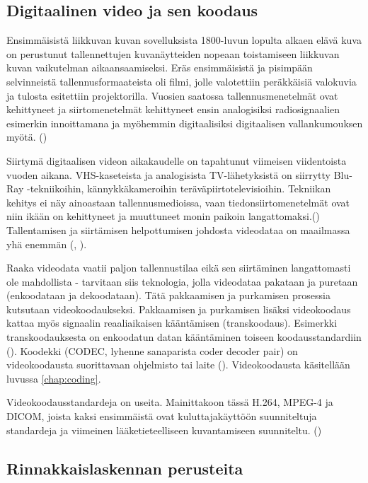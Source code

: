 \subsection{Digitaalinen video ja sen koodaus}

Ensimmäisistä liikkuvan kuvan sovelluksista 1800-luvun lopulta
alkaen elävä kuva on perustunut tallennettujen kuvanäytteiden nopeaan toistamiseen
liikkuvan kuvan vaikutelman aikaansaamiseksi.
Eräs ensimmäisistä ja pisimpään selvinneistä tallennusformaateista oli filmi,
jolle valotettiin peräkkäisiä valokuvia ja tulosta esitettiin projektorilla.
Vuosien saatossa tallennusmenetelmät ovat kehittyneet ja siirtomenetelmät
kehittyneet ensin analogisiksi radiosignaalien esimerkin innoittamana ja
myöhemmin digitaalisiksi digitaalisen vallankumouksen myötä. (\citealt{mitra})

Siirtymä digitaalisen videon aikakaudelle on tapahtunut viimeisen viidentoista
vuoden aikana. VHS-kaseteista ja analogisista TV-lähetyksistä
on siirrytty Blu-Ray -tekniikoihin, kännykkäkameroihin
teräväpiirtotelevisioihin. Tekniikan kehitys ei näy ainoastaan tallennusmedioissa,
vaan tiedonsiirtomenetelmät ovat niin ikään on kehittyneet ja muuttuneet monin paikoin
langattomaksi.(\citealt{h264})
Tallentamisen ja siirtämisen helpottumisen johdosta videodataa on maailmassa
yhä enemmän (\citealt{cisco}, \citealt{youtube}).

Raaka videodata vaatii paljon tallennustilaa eikä sen siirtäminen
langattomasti ole mahdollista - tarvitaan siis teknologia, jolla videodataa pakataan ja puretaan
(enkoodataan ja dekoodataan). Tätä pakkaamisen ja purkamisen prosessia
kutsutaan videokoodaukseksi. Pakkaamisen ja purkamisen lisäksi videokoodaus kattaa
myös signaalin reaaliaikaisen kääntämisen (transkoodaus).
Esimerkki transkoodauksesta on enkoodatun datan kääntäminen toiseen koodausstandardiin (\citealt{mpeg_app}).
Koodekki (CODEC, lyhenne sanaparista coder decoder pair) on videokoodausta suorittavaan
ohjelmisto tai laite (\citealt{h264}). Videokoodausta käsitellään luvussa \ref{chap:coding}.

Videokoodausstandardeja on useita. Mainittakoon tässä H.264, MPEG-4 ja DICOM,
joista kaksi ensimmäistä ovat kuluttajakäyttöön suunniteltuja standardeja
ja viimeinen lääketieteelliseen kuvantamiseen suunniteltu. (\citealt{h264})

\subsection{Rinnakkaislaskennan perusteita}

